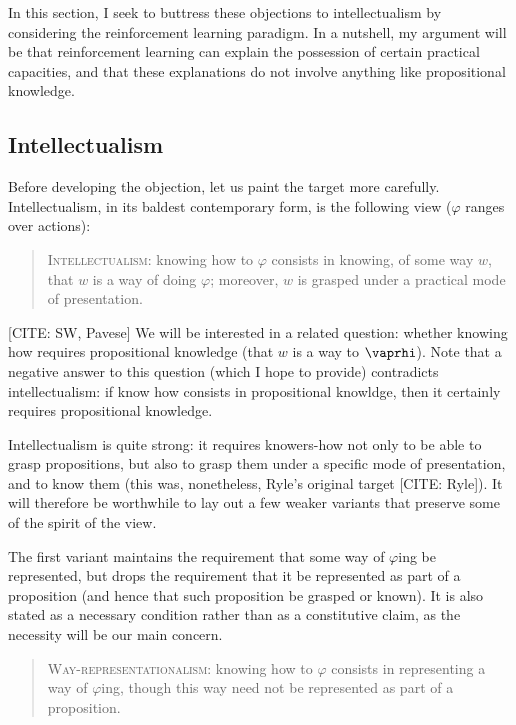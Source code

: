 In this section, I seek to buttress these objections to intellectualism by considering the reinforcement learning paradigm.
In a nutshell, my argument will be that reinforcement learning can explain the possession of certain practical capacities, and that these explanations do not involve anything like propositional knowledge.

\subsection{Intellectualism}

Before developing the objection, let us paint the target more carefully.
Intellectualism, in its baldest contemporary form, is the following view ($\varphi$ ranges over actions):
\begin{quote}
	\textsc{Intellectualism:} knowing how to $\varphi$ consists in knowing, of some way $w$, that $w$ is a way of doing $\varphi$; moreover, $w$ is grasped under a practical mode of presentation.
\end{quote}
[CITE: SW, Pavese]
We will be interested in a related question: whether knowing how requires propositional knowledge (that $w$ is a way to $\vaprhi$).
Note that a negative answer to this question (which I hope to provide) contradicts intellectualism: if know how consists in propositional knowldge, then it certainly requires propositional knowledge.

Intellectualism is quite strong: it requires knowers-how not only to be able to grasp propositions, but also to grasp them under a specific mode of presentation, and to know them (this was, nonetheless, Ryle's original target [CITE: Ryle]).
It will therefore be worthwhile to lay out a few weaker variants that preserve some of the spirit of the view.

The first variant maintains the requirement that some way of $\varphi$ing be represented, but drops the requirement that it be represented as part of a proposition (and hence that such proposition be grasped or known). It is also stated as a necessary condition rather than as a constitutive claim, as the necessity will be our main concern.
\begin{quote}
	\textsc{Way-representationalism:} knowing how to $\varphi$ consists in representing a way of $\varphi$ing, though this way need not be represented as part of a proposition.
\end{quote}






